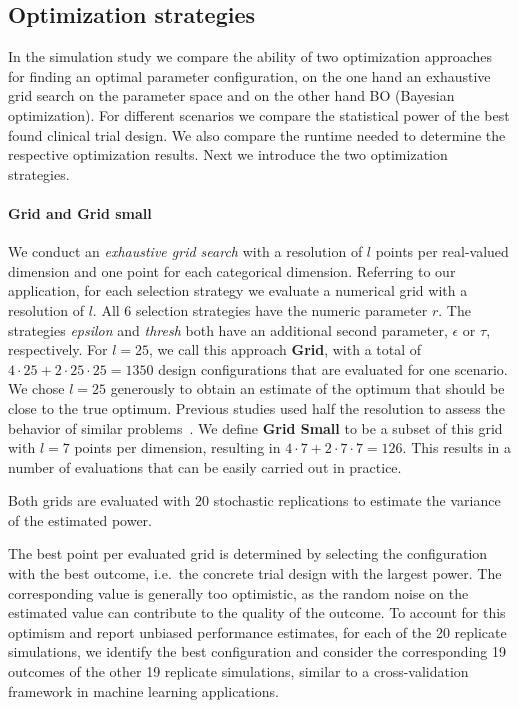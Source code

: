 \documentclass[bimj,fleqn]{w-art}
\theoremstyle{plain}
\theoremstyle{definition}
\begin{document}
\subsection{Optimization strategies}

In the simulation study we compare the ability of two optimization approaches for finding an optimal parameter configuration, on the one hand an exhaustive grid search on the parameter space and on the other hand BO (Bayesian optimization).
For different scenarios we compare the statistical power of the best found clinical trial design.
We also compare the runtime needed to determine the respective optimization results.
Next we introduce the two optimization strategies.

\paragraph{Grid and Grid small}
We conduct an \emph{exhaustive grid search} with a resolution of $l$ points per real-valued dimension and one point for each categorical dimension.
Referring to our application, for each selection strategy we evaluate a numerical grid with a resolution of $l$.
All 6 selection strategies have the numeric parameter $r$.
The strategies \emph{epsilon} and \emph{thresh} both have an additional second parameter, $\epsilon$ or $\tau$, respectively.
For $l=25$, we call this approach \textbf{Grid},
with a total of $4 \cdot 25 + 2 \cdot 25 \cdot 25 = 1350$ design configurations that are evaluated for one scenario.
We chose $l=25$ generously to obtain an estimate of the optimum that should be close to the true optimum.
Previous studies used half the resolution to assess the behavior of similar problems~\citep{friede_adaptive_2020}.
We define \textbf{Grid Small} to be a subset of this grid with $l=7$ points per dimension, resulting in $4 \cdot 7 + 2 \cdot 7 \cdot 7 = 126$.
This results in a number of evaluations that can be easily carried out in practice.

Both grids are evaluated with 20 stochastic replications to estimate the variance of the estimated power.

The best point per evaluated grid is determined by selecting the configuration with the best outcome, i.e.\ the concrete trial design with the largest power.
The corresponding value is generally too optimistic, as the random noise on the estimated value can contribute to the quality of the outcome.
To account for this optimism and report unbiased performance estimates, for each of the 20 replicate simulations, we identify the best configuration and consider the corresponding 19 outcomes of the other 19 replicate simulations, similar to a cross-validation framework in machine learning applications. 
\end{document}
